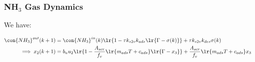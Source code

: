 \subsubsection{NH$_3$ Gas Dynamics}
We have:

\begin{align*}
    \con{NH_3}^{out} (k + 1) &= \con{NH_3}^{in}(k) \lr{1 - \tau k_{s2v}k_{ads} \lr{\Gamma - \sigma(k)}} + \tau k_{s2v} k_{des} \sigma(k)\\
    \implies x_2(k+1) &= b_u u_2 \lr{1 - \frac{A_{scr}}{f_v} \lr{m_{ads}T + c_{ads}} \lr{\Gamma - x_3}} + \frac{A_{scr}}{f_v} \lr{m_{ads}T + c_{ads}} x_3\\
\end{align*}
